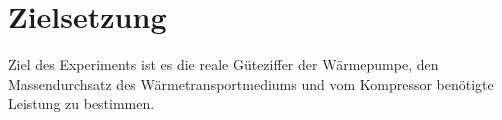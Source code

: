 
\section{Zielsetzung}
\label{sec:Zielsetzung}

Ziel des Experiments ist es die reale Güteziffer der Wärmepumpe, den Massendurchsatz des Wärmetransportmediums und vom Kompressor benötigte Leistung zu bestimmen.